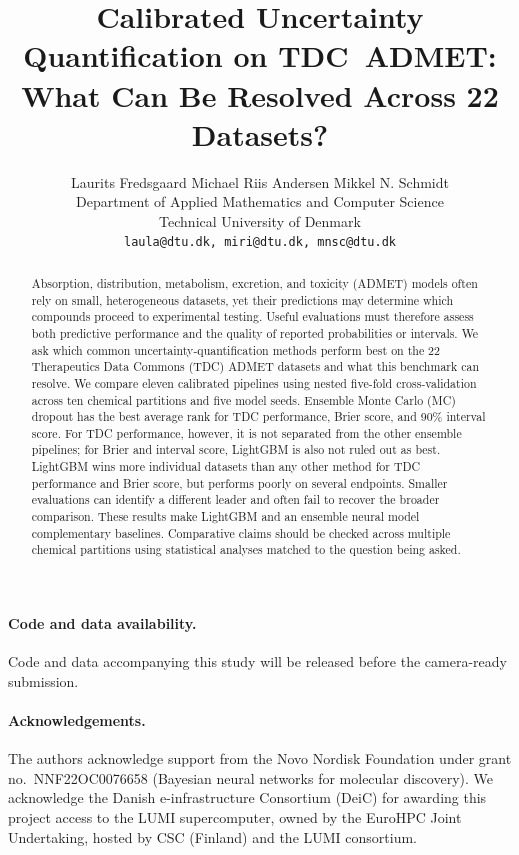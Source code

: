\documentclass{article}
\title{Calibrated Uncertainty Quantification on \mbox{TDC ADMET:}\\
What Can Be Resolved Across 22 Datasets?}
\author{%
  Laurits Fredsgaard \quad Michael Riis Andersen \quad Mikkel N. Schmidt \\
  Department of Applied Mathematics and Computer Science \\
  Technical University of Denmark \\
  \texttt{laula@dtu.dk, miri@dtu.dk, mnsc@dtu.dk}
}
\begin{document}
\maketitle

\begin{abstract}
Absorption, distribution, metabolism, excretion, and toxicity (ADMET) models often rely on small,
heterogeneous datasets, yet their predictions may determine which compounds proceed to experimental
testing. Useful evaluations must therefore assess both predictive performance and the quality of
reported probabilities or intervals. We ask which common uncertainty-quantification methods perform
best on the 22 Therapeutics Data Commons (TDC) ADMET datasets and what this benchmark can resolve. We
compare eleven calibrated pipelines using nested five-fold cross-validation across ten chemical
partitions and five model seeds. Ensemble Monte Carlo (MC) dropout has the best average rank for TDC
performance, Brier score, and 90\% interval score. For TDC performance, however, it is not separated
from the other ensemble pipelines; for Brier and interval score, LightGBM is also not ruled out as
best. LightGBM wins more individual datasets than any other method for TDC performance and Brier
score, but performs poorly on several endpoints. Smaller evaluations can identify a different
leader and often fail to recover the broader comparison. These results make LightGBM and an ensemble
neural model complementary baselines. Comparative claims should be checked across multiple chemical
partitions using statistical analyses matched to the question being asked.
\end{abstract}







\nopagebreak[4]

\paragraph{Code and data availability.}
Code and data accompanying this study will be released before the camera-ready submission.

\nopagebreak[4]
\paragraph{Acknowledgements.}
The authors acknowledge support from the Novo Nordisk Foundation under grant no.\
NNF22OC0076658 (Bayesian neural networks for molecular discovery). We acknowledge the Danish
e-infrastructure Consortium (DeiC) for awarding this project access to the LUMI supercomputer,
owned by the EuroHPC Joint Undertaking, hosted by CSC (Finland) and the LUMI consortium.
\end{document}
